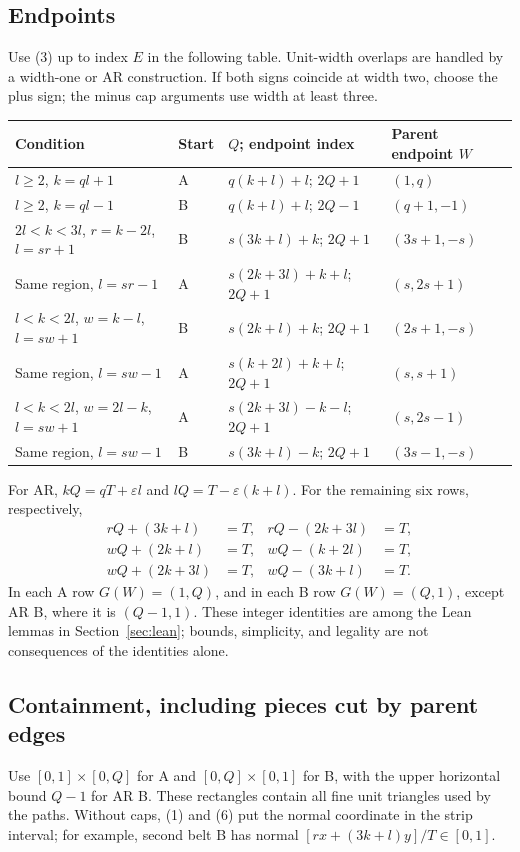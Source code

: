 \documentclass[11pt]{amsart}
\begin{document}
\subsection{Endpoints}
Use (3) up to index $E$ in the following table. Unit-width overlaps are
handled by a width-one or AR construction. If both signs coincide at
width two, choose the plus sign; the minus cap arguments use width at
least three.
\begin{center}\scriptsize
\begin{tabular}{llll}\toprule
Condition & Start & $Q$; endpoint index & Parent endpoint $W$\\\midrule
$l\ge2$, $k=ql+1$ & A & $q(k+l)+l$; $2Q+1$ & $(1,q)$\\
$l\ge2$, $k=ql-1$ & B & $q(k+l)+l$; $2Q-1$ & $(q+1,-1)$\\
$2l<k<3l$, $r=k-2l$, $l=sr+1$ & B & $s(3k+l)+k$; $2Q+1$ & $(3s+1,-s)$\\
Same region, $l=sr-1$ & A & $s(2k+3l)+k+l$; $2Q+1$ & $(s,2s+1)$\\
$l<k<2l$, $w=k-l$, $l=sw+1$ & B & $s(2k+l)+k$; $2Q+1$ & $(2s+1,-s)$\\
Same region, $l=sw-1$ & A & $s(k+2l)+k+l$; $2Q+1$ & $(s,s+1)$\\
$l<k<2l$, $w=2l-k$, $l=sw+1$ & A & $s(2k+3l)-k-l$; $2Q+1$ & $(s,2s-1)$\\
Same region, $l=sw-1$ & B & $s(3k+l)-k$; $2Q+1$ & $(3s-1,-s)$\\\bottomrule
\end{tabular}\end{center}
For AR, $kQ=qT+\varepsilon l$ and $lQ=T-\varepsilon(k+l)$.
For the remaining six rows, respectively,
\begin{equation}\label{eq:6}
\begin{aligned}
rQ+(3k+l)&=T,&rQ-(2k+3l)&=T,\\
wQ+(2k+l)&=T,&wQ-(k+2l)&=T,\\
wQ+(2k+3l)&=T,&wQ-(3k+l)&=T.
\end{aligned}\tag{6}
\end{equation}
In each A row $G(W)=(1,Q)$, and in each B row $G(W)=(Q,1)$,
except AR B, where it is $(Q-1,1)$. These integer identities are among
the Lean lemmas in Section~\ref{sec:lean}; bounds, simplicity, and legality are not
consequences of the identities alone.

\subsection{Containment, including pieces cut by parent edges}
Use $[0,1]\times[0,Q]$ for A and $[0,Q]\times[0,1]$ for B, with
the upper horizontal bound $Q-1$ for AR B. These rectangles contain
all fine unit triangles used by the paths. Without caps, (1) and (6)
put the normal coordinate in the strip interval; for example, second
belt B has normal $[rx+(3k+l)y]/T\in[0,1]$.
\end{document}
